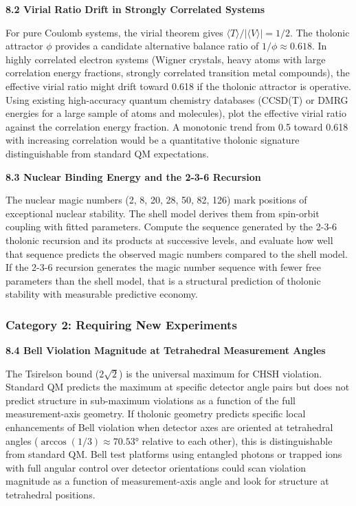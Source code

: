 \documentclass[12pt]{article}
\begin{document}
\textbf{8.2 Virial Ratio Drift in Strongly Correlated Systems}

For pure Coulomb systems, the virial theorem gives
\(\langle T \rangle / |\langle V \rangle| = 1/2\). The tholonic
attractor \(\phi\) provides a candidate alternative balance ratio of
\(1/\phi \approx 0.618\). In highly correlated electron systems (Wigner
crystals, heavy atoms with large correlation energy fractions, strongly
correlated transition metal compounds), the effective virial ratio might
drift toward 0.618 if the tholonic attractor is operative. Using
existing high-accuracy quantum chemistry databases (CCSD(T) or DMRG
energies for a large sample of atoms and molecules), plot the effective
virial ratio against the correlation energy fraction. A monotonic trend
from 0.5 toward 0.618 with increasing correlation would be a
quantitative tholonic signature distinguishable from standard QM
expectations.

\textbf{8.3 Nuclear Binding Energy and the 2-3-6 Recursion}

The nuclear magic numbers (2, 8, 20, 28, 50, 82, 126) mark positions of
exceptional nuclear stability. The shell model derives them from
spin-orbit coupling with fitted parameters. Compute the sequence
generated by the 2-3-6 tholonic recursion and its products at successive
levels, and evaluate how well that sequence predicts the observed magic
numbers compared to the shell model. If the 2-3-6 recursion generates
the magic number sequence with fewer free parameters than the shell
model, that is a structural prediction of tholonic stability with
measurable predictive economy.

\subsubsection{Category 2: Requiring New
Experiments}\label{category-2-requiring-new-experiments}

\textbf{8.4 Bell Violation Magnitude at Tetrahedral Measurement Angles}

The Tsirelson bound (\(2\sqrt{2}\)) is the universal maximum for CHSH
violation. Standard QM predicts the maximum at specific detector angle
pairs but does not predict structure in sub-maximum violations as a
function of the full measurement-axis geometry. If tholonic geometry
predicts specific local enhancements of Bell violation when detector
axes are oriented at tetrahedral angles (\(\arccos(1/3) \approx 70.53°\)
relative to each other), this is distinguishable from standard QM. Bell
test platforms using entangled photons or trapped ions with full angular
control over detector orientations could scan violation magnitude as a
function of measurement-axis angle and look for structure at tetrahedral
positions.
\end{document}
